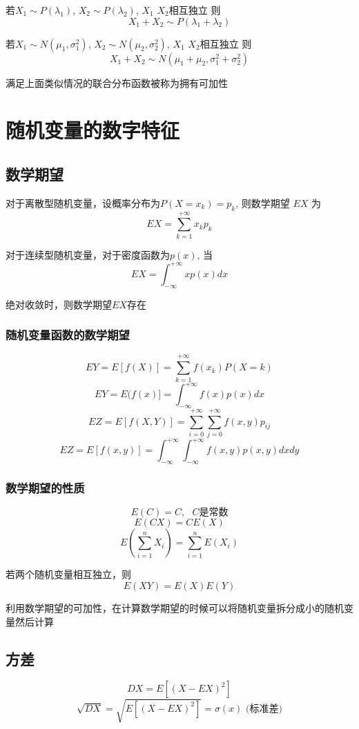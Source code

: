 \documentclass[10pt, a4paper]{article}
\begin{document}
    若$X_1 \sim P(\lambda_1)$, $X_2 \sim P(\lambda_2)$, $X_1$ $X_2$相互独立 则
    $$X_1 + X_2 \sim P(\lambda_1 + \lambda_2)$$
 
    若$X_1 \sim N(\mu_1,\sigma_1^2)$, $X_2 \sim N(\mu_2, \sigma_2^2)$, $X_1$ $X_2$相互独立 则
    $$X_1 + X_2 \sim N(\mu_1 + \mu_2, \sigma_1^2 + \sigma_2^2)$$

    满足上面类似情况的联合分布函数被称为拥有可加性
\newpage
\section{随机变量的数字特征}
    \subsection{数学期望}
        对于离散型随机变量，设概率分布为$P(X = x_k) = p_k$, 则数学期望 $EX$ 为
        $$EX = \sum_{k = 1}^{+\infty}x_kp_k$$

        对于连续型随机变量，对于密度函数为$p(x)$, 当
        $$EX = \int_{-\infty}^{+\infty}xp(x)dx$$
      
        绝对收敛时，则数学期望$EX$存在
    
    \subsubsection{随机变量函数的数学期望}
        $$EY = E[f(X)] = \sum_{k = 1}^{+\infty}f(x_k)P(X = k)$$
        $$EY = E(f(x)] = \int_{-\infty}^{+\infty}f(x)p(x)dx $$
        $$EZ = E[f(X, Y)] = \sum_{i = 0}^{+\infty}\sum_{j = 0}^{+\infty}f(x, y)p_{ij}$$
        $$EZ = E[f(x, y)] = \int_{-\infty}^{+\infty}\int_{-\infty}^{+\infty}f(x, y)p(x, y)dxdy$$

    \subsubsection{数学期望的性质}
    $$E(C) = C, \text{ $C$是常数}$$
    $$E(CX) = CE(X)$$
    $$E(\sum_{i = 1}^nX_i) = \sum_{i = 1}^nE(X_i)$$
    
    若两个随机变量相互独立，则
    $$E(XY) = E(X)E(Y)$$

    利用数学期望的可加性，在计算数学期望的时候可以将随机变量拆分成小的随机变量然后计算

    \subsection{方差}
    $$DX = E[(X - EX)^2]$$
    $$\sqrt{DX} = \sqrt{E[(X - EX)^2]} = \sigma(x) \text{ (标准差)}$$
    
\end{document}
